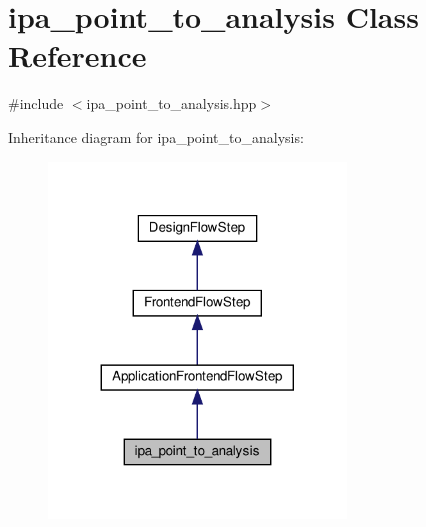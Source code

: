 \hypertarget{classipa__point__to__analysis}{}\section{ipa\+\_\+point\+\_\+to\+\_\+analysis Class Reference}
\label{classipa__point__to__analysis}


{\ttfamily \#include $<$ipa\+\_\+point\+\_\+to\+\_\+analysis.\+hpp$>$}



Inheritance diagram for ipa\+\_\+point\+\_\+to\+\_\+analysis\+:
\nopagebreak
\begin{figure}[H]
\begin{center}
\leavevmode
\includegraphics[width=224pt]{db/df9/classipa__point__to__analysis__inherit__graph}
\end{center}
\end{figure}


